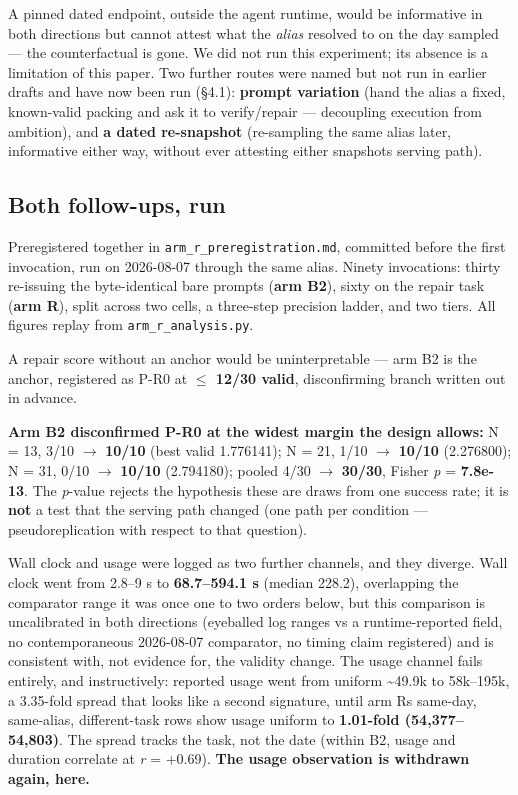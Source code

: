 A pinned dated endpoint, outside the agent runtime, would be informative in both directions but cannot attest what the \emph{alias} resolved to on the day sampled --- the counterfactual is gone. We did not run this experiment; its absence is a limitation of this paper. Two further routes were named but not run in earlier drafts and have now been run (§4.1): \textbf{prompt variation} (hand the alias a fixed, known-valid packing and ask it to verify/repair --- decoupling execution from ambition), and \textbf{a dated re-snapshot} (re-sampling the same alias later, informative either way, without ever attesting either snapshot\textquotesingle s serving path).

\hypertarget{both-follow-ups-run}{%
\subsection{Both follow-ups, run}\label{both-follow-ups-run}}

Preregistered together in \texttt{arm\_r\_preregistration.md}, committed before the first invocation, run on 2026-08-07 through the same alias. Ninety invocations: thirty re-issuing the byte-identical bare prompts (\textbf{arm B2}), sixty on the repair task (\textbf{arm R}), split across two cells, a three-step precision ladder, and two tiers. All figures replay from \texttt{arm\_r\_analysis.py}.

A repair score without an anchor would be uninterpretable --- arm B2 is the anchor, registered as P-R0 at \textbf{\(\leq\) 12/30 valid}, disconfirming branch written out in advance.

\textbf{Arm B2 disconfirmed P-R0 at the widest margin the design allows:} N = 13, 3/10 \(\rightarrow\) \textbf{10/10} (best valid 1.776141); N = 21, 1/10 \(\rightarrow\) \textbf{10/10} (2.276800); N = 31, 0/10 \(\rightarrow\) \textbf{10/10} (2.794180); pooled 4/30 \(\rightarrow\) \textbf{30/30}, Fisher \emph{p} = \textbf{7.8e-13}. The \emph{p}-value rejects the hypothesis these are draws from one success rate; it is \textbf{not} a test that the serving path changed (one path per condition --- pseudoreplication with respect to that question).

Wall clock and usage were logged as two further channels, and they diverge. Wall clock went from 2.8--9 s to \textbf{68.7--594.1 s} (median 228.2), overlapping the comparator range it was once one to two orders below, but this comparison is uncalibrated in both directions (eyeballed log ranges vs a runtime-reported field, no contemporaneous 2026-08-07 comparator, no timing claim registered) and is consistent with, not evidence for, the validity change. The usage channel fails entirely, and instructively: reported usage went from uniform \textasciitilde49.9k to 58k--195k, a 3.35-fold spread that looks like a second signature, until arm R\textquotesingle s same-day, same-alias, different-task rows show usage uniform to \textbf{1.01-fold (54,377--54,803)}. The spread tracks the task, not the date (within B2, usage and duration correlate at \emph{r} = +0.69). \textbf{The usage observation is withdrawn again, here.}

